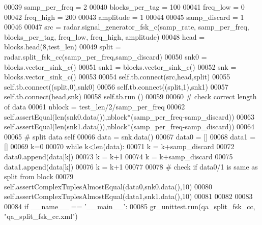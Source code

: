 \begin{DoxyCode}
00039         samp\_per\_freq = 2
00040         blocks\_per\_tag = 100
00041         freq\_low = 0
00042         freq\_high = 200
00043         amplitude = 1
00044         
00045         samp\_discard = 1
00046         
00047         src = radar.signal\_generator\_fsk\_c(samp\_rate, samp\_per\_freq, blocks\_per\_tag, freq\_low, freq\_high, 
      amplitude)
00048         head = blocks.head(8,test\_len)
00049         split = radar.split\_fsk\_cc(samp\_per\_freq,samp\_discard)
00050         snk0 = blocks.vector\_sink\_c()
00051         snk1 = blocks.vector\_sink\_c()
00052         snk = blocks.vector\_sink\_c()
00053         
00054         self.tb.connect(src,head,split)
00055         self.tb.connect((split,0),snk0)
00056         self.tb.connect((split,1),snk1)
00057         self.tb.connect(head,snk)
00058         self.tb.run ()
00059         
00060         \textcolor{comment}{# check correct length of data}
00061         nblock = test\_len/2/samp\_per\_freq
00062         self.assertEqual(len(snk0.data()),nblock*(samp\_per\_freq-samp\_discard))
00063         self.assertEqual(len(snk1.data()),nblock*(samp\_per\_freq-samp\_discard))
00064         
00065         \textcolor{comment}{# split data self}
00066         data = snk.data()
00067         data0 = []
00068         data1 = []
00069         k=0
00070         \textcolor{keywordflow}{while} k<len(data):
00071             k = k+samp\_discard
00072             data0.append(data[k])
00073             k = k+1
00074             k = k+samp\_discard
00075             data1.append(data[k])
00076             k = k+1
00077         
00078         \textcolor{comment}{# check if data0/1 is same as split from block}
00079         self.assertComplexTuplesAlmostEqual(data0,snk0.data(),10)
00080         self.assertComplexTuplesAlmostEqual(data1,snk1.data(),10)
00081             
00082         
00083 
00084 \textcolor{keywordflow}{if} \_\_name\_\_ == \textcolor{stringliteral}{'\_\_main\_\_'}:
00085     gr\_unittest.run(qa\_split\_fsk\_cc, \textcolor{stringliteral}{"qa\_split\_fsk\_cc.xml"})
\end{DoxyCode}
